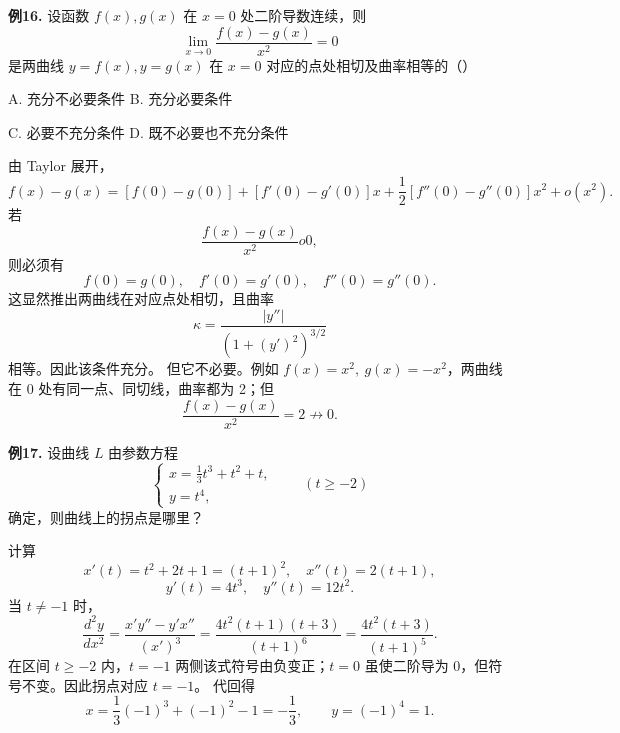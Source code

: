 \begin{problemblock}
\textbf{例16.} 设函数 \(f(x),g(x)\) 在 \(x=0\) 处二阶导数连续，则
\[
\lim_{x\to0}\frac{f(x)-g(x)}{x^2}=0
\]
是两曲线 \(y=f(x),y=g(x)\) 在 \(x=0\) 对应的点处相切及曲率相等的（\quad）

A. 充分不必要条件 \qquad B. 充分必要条件

C. 必要不充分条件 \qquad D. 既不必要也不充分条件
\end{problemblock}
\begin{solutionblock}
由 Taylor 展开，
\[
f(x)-g(x)=[f(0)-g(0)]+[f'(0)-g'(0)]x+\frac{1}{2}[f''(0)-g''(0)]x^2+o(x^2).
\]
若
\[
\frac{f(x)-g(x)}{x^2}	o0,
\]
则必须有
\[
f(0)=g(0),\quad f'(0)=g'(0),\quad f''(0)=g''(0).
\]
这显然推出两曲线在对应点处相切，且曲率
\[
\kappa=\frac{|y''|}{(1+(y')^2)^{3/2}}
\]
相等。因此该条件充分。
但它不必要。例如 \(f(x)=x^2,\ g(x)=-x^2\)，两曲线在 0 处有同一点、同切线，曲率都为 2；但
\[
\frac{f(x)-g(x)}{x^2}=2\not\to0.
\]
\end{solutionblock}

\begin{problemblock}
\textbf{例17.} 设曲线 \(L\) 由参数方程
\[
\begin{cases}
x=\frac13t^3+t^2+t,\\
y=t^4,
\end{cases}\qquad (t\ge -2)
\]
确定，则曲线上的拐点是哪里？
\end{problemblock}
\begin{solutionblock}
计算
\[
x'(t)=t^2+2t+1=(t+1)^2,
\quad x''(t)=2(t+1),
\]
\[
y'(t)=4t^3,
\quad y''(t)=12t^2.
\]
当 \(t\ne-1\) 时，
\[
\frac{d^2y}{dx^2}
=\frac{x'y''-y'x''}{(x')^3}
=\frac{4t^2(t+1)(t+3)}{(t+1)^6}
=\frac{4t^2(t+3)}{(t+1)^5}.
\]
在区间 \(t\ge-2\) 内，\(t=-1\) 两侧该式符号由负变正；\(t=0\) 虽使二阶导为 0，但符号不变。因此拐点对应 \(t=-1\)。
代回得
\[
x=\frac13(-1)^3+(-1)^2-1=-\frac13,
\qquad y=(-1)^4=1.
\]
\end{solutionblock}

